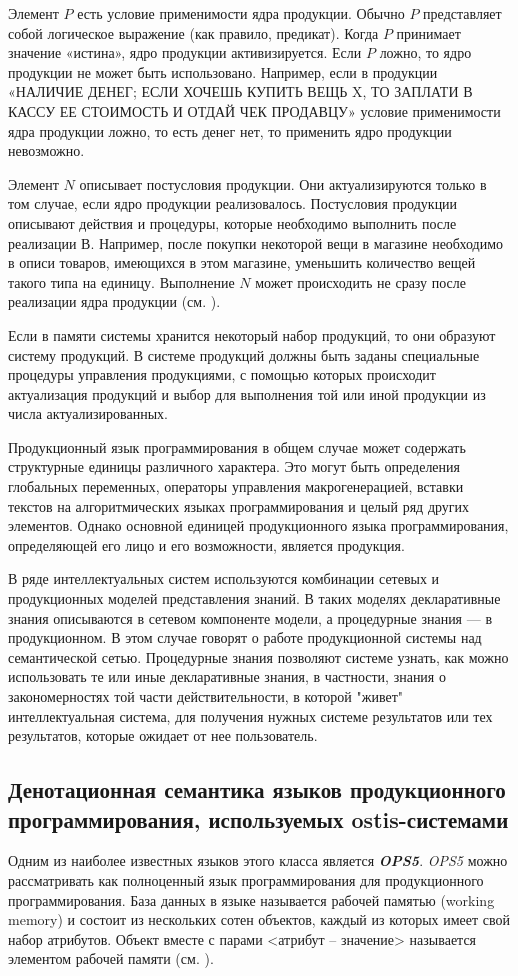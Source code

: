 Элемент $P$ есть условие применимости ядра продукции. Обычно $P$ представляет собой логическое выражение (как правило, предикат). Когда $P$ принимает значение «истина», ядро продукции активизируется. Если $P$ ложно, то ядро продукции не может быть использовано. Например, если в продукции «НАЛИЧИЕ ДЕНЕГ; ЕСЛИ ХОЧЕШЬ КУПИТЬ ВЕЩЬ X, ТО ЗАПЛАТИ В КАССУ ЕЕ СТОИМОСТЬ И ОТДАЙ ЧЕК ПРОДАВЦУ» условие применимости ядра продукции ложно, то есть денег нет, то применить ядро продукции невозможно.

Элемент $N$ описывает постусловия продукции. Они актуализируются только в том случае, если ядро продукции реализовалось. Постусловия продукции описывают действия и процедуры, которые необходимо выполнить после реализации В. Например, после покупки некоторой вещи в магазине необходимо в описи товаров, имеющихся в этом магазине, уменьшить количество вещей такого типа на единицу. Выполнение $N$ может происходить не сразу после реализации ядра продукции (см. ).

Если в памяти системы хранится некоторый набор продукций, то они образуют систему продукций. В системе продукций должны быть заданы специальные процедуры управления продукциями, с помощью которых происходит актуализация продукций и выбор для выполнения той или иной продукции из числа актуализированных.

Продукционный язык программирования в общем случае может содержать структурные единицы различного характера. Это могут быть определения глобальных переменных, операторы управления макрогенерацией, вставки текстов на алгоритмических языках программирования и целый ряд других элементов. Однако основной единицей продукционного языка программирования, определяющей его лицо и его возможности, является продукция.

В ряде интеллектуальных систем используются комбинации сетевых и продукционных моделей представления знаний. В таких моделях декларативные знания описываются в сетевом компоненте модели, а процедурные знания --- в продукционном. В этом случае говорят о работе продукционной системы над семантической сетью. Процедурные знания позволяют системе узнать, как можно использовать те или иные декларативные знания, в частности, знания о закономерностях той части действительности, в которой "живет"{} интеллектуальная система, для получения нужных системе результатов или тех результатов, которые ожидает от нее пользователь.



\subsection{Денотационная семантика языков продукционного программирования, используемых ostis-системами}
Одним из наиболее известных языков этого класса является \textbf{\textit{OPS5}}. \textit{OPS5} можно рассматривать как полноценный язык программирования для продукционного программирования.
База данных в языке называется рабочей памятью (working memory) и состоит из нескольких сотен объектов, каждый из ко­торых имеет свой набор атрибутов. Объект вместе с парами <атрибут -- значение> называется элементом рабочей памяти (см. ). 

